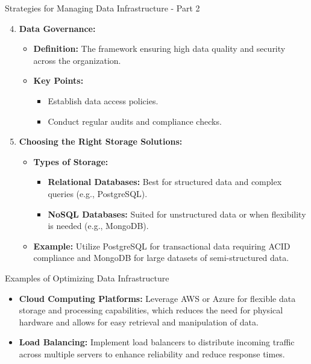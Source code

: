 \documentclass[aspectratio=169]{beamer}
\begin{document}
\begin{frame}[fragile]{Strategies for Managing Data Infrastructure - Part 2}
  \begin{enumerate}
    \setcounter{enumi}{3}
    
    \item \textbf{Data Governance:}
      \begin{itemize}
        \item \textbf{Definition:} The framework ensuring high data quality and security across the organization.
        \item \textbf{Key Points:}
          \begin{itemize}
            \item Establish data access policies.
            \item Conduct regular audits and compliance checks.
          \end{itemize}
      \end{itemize}

    \item \textbf{Choosing the Right Storage Solutions:}
      \begin{itemize}
        \item \textbf{Types of Storage:}
          \begin{itemize}
            \item \textbf{Relational Databases:} Best for structured data and complex queries (e.g., PostgreSQL).
            \item \textbf{NoSQL Databases:} Suited for unstructured data or when flexibility is needed (e.g., MongoDB).
          \end{itemize}
        \item \textbf{Example:} Utilize PostgreSQL for transactional data requiring ACID compliance and MongoDB for large datasets of semi-structured data.
      \end{itemize}
  \end{enumerate}
\end{frame}

\begin{frame}[fragile]{Examples of Optimizing Data Infrastructure}
  \begin{itemize}
    \item \textbf{Cloud Computing Platforms:} 
      Leverage AWS or Azure for flexible data storage and processing capabilities, which reduces the need for physical hardware and allows for easy retrieval and manipulation of data.
    
    \item \textbf{Load Balancing:} 
      Implement load balancers to distribute incoming traffic across multiple servers to enhance reliability and reduce response times.
  \end{itemize}
\end{frame}
\end{document}
